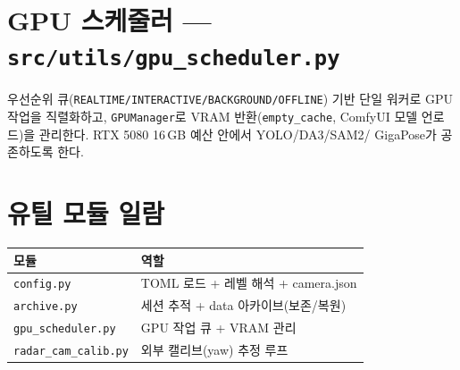 \section{GPU 스케줄러 — \texttt{src/utils/gpu\_scheduler.py}}
우선순위 큐(\texttt{REALTIME/INTERACTIVE/BACKGROUND/OFFLINE}) 기반 단일 워커로
GPU 작업을 직렬화하고, \texttt{GPUManager}로 VRAM 반환(\texttt{empty\_cache},
ComfyUI 모델 언로드)을 관리한다. RTX 5080 16\,GB 예산 안에서 YOLO/DA3/SAM2/
GigaPose가 공존하도록 한다.

\section{유틸 모듈 일람}
\begin{center}
\begin{tabular}{@{}ll@{}}
\toprule
모듈 & 역할 \\
\midrule
\texttt{config.py}          & TOML 로드 + 레벨 해석 + camera.json \\
\texttt{archive.py}         & 세션 추적 + data 아카이브(보존/복원) \\
\texttt{gpu\_scheduler.py}  & GPU 작업 큐 + VRAM 관리 \\
\texttt{radar\_cam\_calib.py}& 외부 캘리브(yaw) 추정 루프 \\
\bottomrule
\end{tabular}
\end{center}
